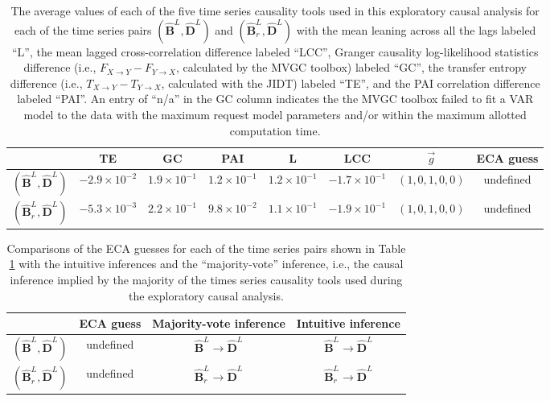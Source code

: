 \begin{table}
\begin{center}
\begin{tabular}{lccccccc}
  & TE & GC & PAI & L & LCC & $\vec{g}$ & ECA guess\\
\midrule
$(\hat{\mathbf{B}}^L,\hat{\mathbf{D}}^L)$ & $-2.9\times 10^{-2}$ & $1.9\times 10^{-1}$ & $1.2\times 10^{-1}$ & $1.2\times 10^{-1}$ & $-1.7\times 10^{-1}$ & $(1,0,1,0,0)$ & undefined\\
$(\hat{\mathbf{B}}^L_r,\hat{\mathbf{D}}^L)$ & $-5.3\times 10^{-3}$ & $2.2\times 10^{-1}$ & $9.8\times 10^{-2}$ & $1.1\times 10^{-1}$ & $-1.9\times 10^{-1}$ & $(1,0,1,0,0)$ & undefined
\end{tabular}
\caption[The average values of each of the five time series causality tools]{The average values of each of the five time series causality tools used in this exploratory causal analysis for each of the time series pairs $(\hat{\mathbf{B}}^L,\hat{\mathbf{D}}^L)$ and $(\hat{\mathbf{B}}^L_r,\hat{\mathbf{D}}^L)$ with the mean leaning across all the lags labeled ``L'', the mean lagged cross-correlation difference labeled ``LCC'', Granger causality log-likelihood statistics difference (i.e., $F_{X\rightarrow Y}-F_{Y\rightarrow X}$, calculated by the MVGC toolbox) labeled ``GC'', the transfer entropy difference (i.e., $T_{X\rightarrow Y}-T_{Y\rightarrow X}$, calculated with the JIDT) labeled ``TE'', and the PAI correlation difference labeled ``PAI''.  An entry of ``n/a'' in the GC column indicates the the MVGC toolbox failed to fit a VAR model to the data with the maximum request model parameters and/or within the maximum allotted computation time.}
\label{tab:SolExSamp}
\end{center}
\end{table}
\begin{table}
\begin{center}
\begin{tabular}{lccc}
  & ECA guess & Majority-vote inference & Intuitive inference\\
\midrule
$(\hat{\mathbf{B}}^L,\hat{\mathbf{D}}^L)$ & undefined & $\hat{\mathbf{B}}^L\rightarrow\hat{\mathbf{D}}^L$ & $\hat{\mathbf{B}}^L\rightarrow\hat{\mathbf{D}}^L$\\
$(\hat{\mathbf{B}}^L_r,\hat{\mathbf{D}}^L)$ & undefined & $\hat{\mathbf{B}}^L_r\rightarrow\hat{\mathbf{D}}^L$ & $\hat{\mathbf{B}}^L_r\rightarrow\hat{\mathbf{D}}^L$
\end{tabular}
\caption[Comparisons of the average ECA guesses]{Comparisons of the ECA guesses for each of the time series pairs shown in Table \ref{tab:SolExSamp} with the intuitive inferences and the ``majority-vote'' inference, i.e., the causal inference implied by the majority of the times series causality tools used during the exploratory causal analysis.}
\label{tab:SolExSampECAguess}
\end{center}
\end{table}

